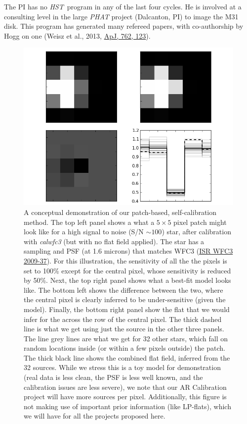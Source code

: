 \documentclass[12pt]{article}
\newcommand{\project}[1]{\textsl{#1}}
\newcommand{\HST}{\project{HST}}
\begin{document}
The PI has no \HST\ program in any of the last four cycles.  He is
involved at a consulting level in the large \project{PHAT} project
(Dalcanton, PI) to image the M31 disk.  This program has generated
many refereed papers, with co-authorship by Hogg on one (Weisz et al.,
2013, \href{http://dx.doi.org/10.1088/0004-637X/762/2/123}{ApJ, 762, 123}).


\begin{figure}
\centering
 \includegraphics[scale=0.75]{toy32.png}
\caption{A conceptual demonstration of our patch-based,
  self-calibration method.  The top left panel shows a what a $5\times5$
  pixel patch might look like for a high signal to noise (S/N $\sim
  100$) star, after
  calibration with \textsl{calwfc3} (but with no flat field applied).
  The star has a sampling and PSF (at 1.6 microns) that matches WFC3
  (\href{http://bit.ly/XFSb1M}{ISR WFC3 2009-37}).  For this
  illustration, the sensitivity of all the the pixels is set to 100\%
  except for the central pixel, whose sensitivity is reduced by 50\%.
  Next, the top right panel shows what a best-fit model looks like.
  The bottom left shows the difference between the two, where the
  central pixel is clearly inferred to be under-sensitive (given the
  model).  Finally, the bottom right panel show the flat that we would
  infer for the across the row of the central pixel.  The thick dashed
  line is what we get using just the source in the other three
  panels.  The line grey lines are what we get for 32 other stars,
  which fall on random locations inside (or within a few pixels
  outside) the patch.  The thick black line shows the combined flat
  field, inferred from the 32 sources.  While we stress this is a toy
  model for demonstration (real data is less clean, the PSF is less
  well known, and the calibration issues are less severe),
  we note that our AR Calibration project will have
  more sources per pixel.  Additionally, this figure is not making use of
  important prior information (like LP-flats), which we will have for
  all the projects proposed here.}
\label{fig:2D}
\end{figure}




\end{document}
